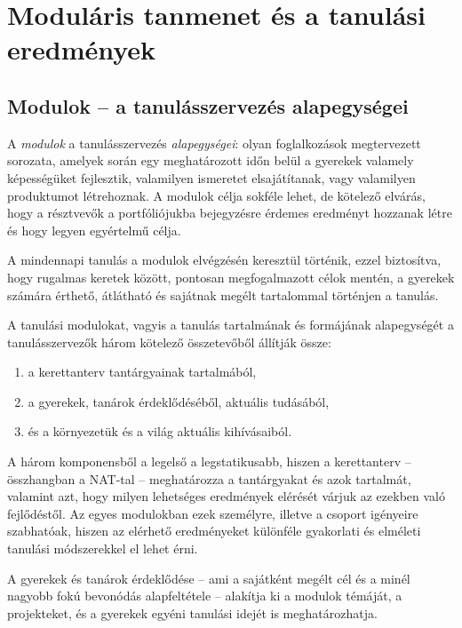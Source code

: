 \section{Moduláris tanmenet és a tanulási eredmények}

\subsection{Modulok -- a tanulásszervezés alapegységei}
\label{sec:modulok}

A \emph{modulok} a tanulásszervezés \emph{alapegységei}: olyan foglalkozások megtervezett sorozata, amelyek során egy meghatározott időn belül a gyerekek valamely képességüket fejlesztik, valamilyen ismeretet elsajátítanak, vagy valamilyen produktumot létrehoznak. A modulok célja sokféle lehet, de kötelező elvárás, hogy a résztvevők a portfóliójukba bejegyzésre érdemes eredményt hozzanak létre és hogy legyen egyértelmű célja.

A mindennapi tanulás a modulok elvégzésén keresztül történik, ezzel biztosítva, hogy rugalmas keretek között, pontosan megfogalmazott célok mentén, a gyerekek számára érthető, átlátható és sajátnak megélt tartalommal történjen a tanulás.

A tanulási modulokat, vagyis a tanulás tartalmának és formájának alapegységét a tanulásszervezők három kötelező összetevőből állítják össze:

\begin{enumerate}
      \item
            a kerettanterv tantárgyainak tartalmából,
      \item
            a gyerekek, tanárok érdeklődéséből, aktuális tudásából,
      \item
            és a környezetük és a világ aktuális kihívásaiból.
\end{enumerate}

A három komponensből a legelső a legstatikusabb, hiszen a kerettanterv -- összhangban a NAT-tal -- meghatározza a tantárgyakat és azok tartalmát, valamint azt, hogy milyen lehetséges eredmények elérését várjuk az ezekben való fejlődéstől. Az egyes modulokban ezek személyre, illetve a csoport igényeire szabhatóak, hiszen az elérhető eredményeket különféle gyakorlati és elméleti tanulási módszerekkel el lehet érni.

A gyerekek és tanárok érdeklődése -- ami a sajátként megélt cél és a minél nagyobb fokú bevonódás alapfeltétele -- alakítja ki a modulok témáját, a projekteket, és a gyerekek egyéni tanulási idejét is meghatározhatja.

